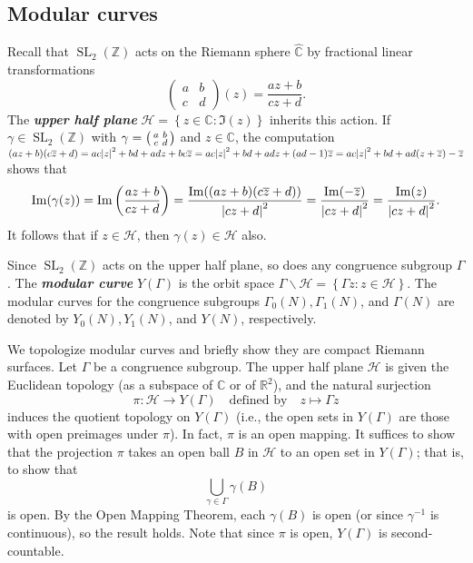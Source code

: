 \documentclass[10pt,leqno]{article}
\newcommand{\cbr}[1]{\left\{#1\right\}}
\newcommand{\textib}[1]{\textbf{\textit{#1}}}
\DeclareMathOperator{\SL}{SL}
\begin{document}
\subsection{Modular curves}
Recall that $\SL_2(\mathbb{Z})$ acts on the Riemann sphere $\widehat{\mathbb{C}}$ by fractional linear transformations \[\begin{pmatrix}
    a & b \\ c & d
\end{pmatrix}(z) = \frac{az + b}{cz+d}.\] The \textib{upper half plane} $\mathcal{H} = \cbr{z\in\mathbb{C} : \Im(z)}$ inherits this action. If $\gamma\in \SL_2(\mathbb{Z})$ with $\gamma = \begin{psmallmatrix}
    a & b \\ c & d
\end{psmallmatrix}$ and $z\in \mathbb C$, the computation $(az+b)(c\overline z + d) = ac\abs{z}^2+bd + adz + bc\overline z = ac\abs{z}^2+bd + adz + (ad-1)\overline z = ac\abs{z}^2+bd + ad(z+\overline z) -\overline z$ shows that
\begin{equation}\label{eq: imaginary parts}
    \Im(\gamma(z)) = \Im\bigg(\frac{az+b}{cz+d}\bigg) = \frac{\Im((az+b)(c\overline z + d))}{\abs{cz+d}^2} = \frac{\Im(-\overline z)}{\abs{cz+d}^2} = \frac{\Im(z)}{\abs{cz+d}^2}.
\end{equation}
It follows that if $z\in \mathcal{H}$, then $\gamma(z)\in \mathcal{H}$ also.

Since $\SL_2(\mathbb{Z})$ acts on the upper half plane, so does any congruence subgroup $\varGamma$. The \textib{modular curve} $Y(\varGamma)$ is the orbit space $\varGamma\backslash \mathcal{H} = \cbr{\varGamma z : z\in\mathcal H}$. The modular curves for the congruence subgroups $\varGamma_0(N), \varGamma_1(N)$, and $\varGamma(N)$ are denoted by $Y_0(N), Y_1(N)$, and $Y(N)$, respectively.

We topologize modular curves and briefly show they are compact Riemann surfaces. Let $\varGamma$ be a congruence subgroup. The upper half plane $\mathcal H$ is given the Euclidean topology (as a subspace of $\mathbb{C}$ or of $\mathbb{R}^2$), and the natural surjection \[\pi \colon \mathcal H \to Y(\varGamma)\quad \text{defined by}\quad  z\mapsto \varGamma z\] induces the quotient topology on $Y(\varGamma)$ (i.e., the open sets in $Y(\varGamma)$ are those with open preimages under $\pi$). In fact, $\pi$ is an open mapping. It suffices to show that the projection $\pi$ takes an open ball $B$ in $\mathcal{H}$ to an open set in $Y(\varGamma)$; that is, to show that \[\bigcup_{\gamma\in \varGamma}\gamma(B)\] is open. By the Open Mapping Theorem, each $\gamma(B)$ is open (or since $\gamma^{-1}$ is continuous), so the result holds. Note that since $\pi$ is open, $Y(\varGamma)$ is second-countable.
\end{document}
